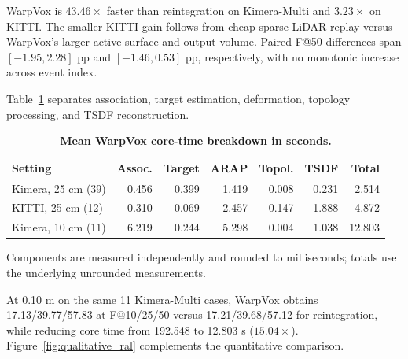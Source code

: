 WarpVox is $43.46\times$ faster than reintegration on Kimera-Multi and
$3.23\times$ on KITTI. The smaller KITTI gain follows from cheap sparse-LiDAR
replay versus WarpVox's larger active surface and output volume. Paired F@50
differences span $[-1.95,2.28]$ pp and $[-1.46,0.53]$ pp, respectively, with no
monotonic increase across event index.

Table~\ref{tab:runtime_breakdown} separates association, target estimation,
deformation, topology processing, and TSDF reconstruction.

\begin{table}[t]
\centering
\caption{\textbf{Mean WarpVox core-time breakdown in seconds.}}
\label{tab:runtime_breakdown}
\scriptsize
\setlength{\tabcolsep}{1.25pt}
\begin{tabular}{lrrrrrr}
\toprule
Setting & Assoc. & Target & ARAP & Topol. & TSDF & Total \\
\midrule
Kimera, 25 cm (39) & 0.456 & 0.399 & 1.419 & 0.008 & 0.231 & 2.514 \\
KITTI, 25 cm (12)   & 0.310 & 0.069 & 2.457 & 0.147 & 1.888 & 4.872 \\
Kimera, 10 cm (11) & 6.219 & 0.244 & 5.298 & 0.004 & 1.038 & 12.803 \\
\bottomrule
\end{tabular}
\vspace{1pt}

\parbox{\columnwidth}{\scriptsize Components are measured independently and
rounded to milliseconds; totals use the underlying unrounded measurements.}
\end{table}

At 0.10 m on the same 11 Kimera-Multi cases, WarpVox obtains
17.13/39.77/57.83 at F@10/25/50 versus 17.21/39.68/57.12 for reintegration,
while reducing core time from 192.548 to 12.803 s ($15.04\times$).
Figure~\ref{fig:qualitative_ral} complements the quantitative comparison.

